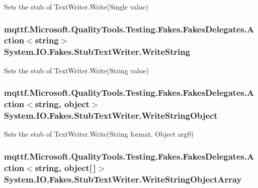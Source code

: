 Sets the stub of Text\-Writer.\-Write(\-Single value)

\hypertarget{class_system_1_1_i_o_1_1_fakes_1_1_stub_text_writer_af0a539ea1044339a1d185290aa32b513}{
\subsubsection[{Write\-String}]{\setlength{\rightskip}{0pt plus 5cm}mqttf.\-Microsoft.\-Quality\-Tools.\-Testing.\-Fakes.\-Fakes\-Delegates.\-Action$<$string$>$ System.\-I\-O.\-Fakes.\-Stub\-Text\-Writer.\-Write\-String}}\label{class_system_1_1_i_o_1_1_fakes_1_1_stub_text_writer_af0a539ea1044339a1d185290aa32b513}


Sets the stub of Text\-Writer.\-Write(\-String value)

\hypertarget{class_system_1_1_i_o_1_1_fakes_1_1_stub_text_writer_aaff5f4694d123d2e888dd8357be116a7}{
\subsubsection[{Write\-String\-Object}]{\setlength{\rightskip}{0pt plus 5cm}mqttf.\-Microsoft.\-Quality\-Tools.\-Testing.\-Fakes.\-Fakes\-Delegates.\-Action$<$string, object$>$ System.\-I\-O.\-Fakes.\-Stub\-Text\-Writer.\-Write\-String\-Object}}\label{class_system_1_1_i_o_1_1_fakes_1_1_stub_text_writer_aaff5f4694d123d2e888dd8357be116a7}


Sets the stub of Text\-Writer.\-Write(\-String format, Object arg0)

\hypertarget{class_system_1_1_i_o_1_1_fakes_1_1_stub_text_writer_a7beca0f2ec118191400925682b40b825}{
\subsubsection[{Write\-String\-Object\-Array}]{\setlength{\rightskip}{0pt plus 5cm}mqttf.\-Microsoft.\-Quality\-Tools.\-Testing.\-Fakes.\-Fakes\-Delegates.\-Action$<$string, object\mbox{[}$\,$\mbox{]}$>$ System.\-I\-O.\-Fakes.\-Stub\-Text\-Writer.\-Write\-String\-Object\-Array}}\label{class_system_1_1_i_o_1_1_fakes_1_1_stub_text_writer_a7beca0f2ec118191400925682b40b825}


